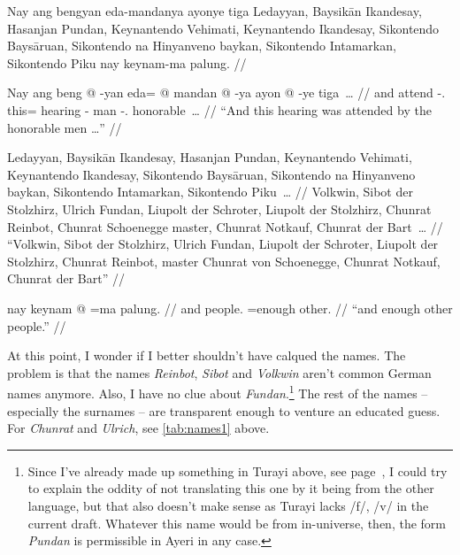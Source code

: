 \documentclass[12pt,paper=a4]{scrartcl}
\newcommand{\fw}[1]{\textit{#1}} %
\begin{document}

\pex 
	\glpreamble Nay ang bengyan eda-mandanya ayonye tiga Ledayyan, Baysikān 
		Ikandesay, Hasanjan Pundan, Keynantendo Vehimati, Keynantendo 
		Ikandesay, Sikontendo Baysāruan, Sikontendo na Hinyanveno 
		baykan, Sikontendo Intamarkan, Sikontendo Piku nay keynam-ma 
		palung. //
	
	\a \begingl
		\gla Nay ang beng @ -yan eda= @ mandan @ -ya ayon @ -ye tiga~… //
		\glb and \AgtT{} attend -\Tpl{}.\M{} this= hearing -\Loc{} man 
			-\Pl{}.\Top{} honorable~… //
		\glft \enquote{And this hearing was attended by the honorable men 
			…} //
	\endgl
	
	\a \begingl
		\gla Ledayyan, Baysikān Ikandesay, Hasanjan Pundan, Keynantendo 
			Vehimati, Keynantendo Ikandesay, Sikontendo Baysāruan, 
			Sikontendo na Hinyanveno baykan, Sikontendo Intamarkan, 
			Sikontendo Piku~… //
		\glb Volkwin, Sibot {der Stolzhirz}, Ulrich Fundan, Liupolt 
			{der Schroter}, Liupolt {der Stolzhirz}, Chunrat 
			Reinbot, Chunrat \Gen{} Schoenegge master, Chunrat 
			Notkauf, Chunrat {der Bart}~… //
		\glft \enquote{Volkwin, Sibot der Stolzhirz, Ulrich Fundan, 
			Liupolt der Schroter, Liupolt der Stolzhirz, Chunrat 
			Reinbot, master Chunrat von Schoenegge, Chunrat Notkauf, 
			Chunrat der Bart} //
	\endgl
	
	\a \begingl
		\gla nay keynam @ =ma palung. //
		\glb and people.\Top{} =enough other. //
		\glft \enquote{and enough other people.} //
	\endgl
\xe

At this point, I wonder if I better shouldn't have calqued the names. The 
problem is that the names \fw{Reinbot}, \fw{Sibot} and \fw{Volkwin} aren't 
common German names anymore. Also, I have no clue about 
\fw{Fundan}.\footnote{Since I've already made up something in Turayi above, 
see page~\pageref{ex:innomine}, I could try to explain the oddity of not 
translating this one by it being from the other language, but that also doesn't 
make sense as Turayi lacks /f/, /v/ in the current draft. Whatever this name 
would be from in-universe, then, the form \fw{Pundan} is permissible in Ayeri 
in any case.} The rest of the names -- especially the surnames -- are 
transparent enough to venture an educated guess. For \fw{Chunrat} and 
\fw{Ulrich}, see \autoref{tab:names1} above.
\end{document}
